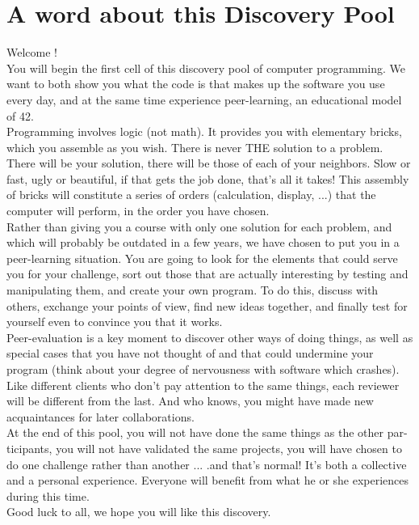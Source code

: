 \documentclass[12pt, a4paper]{report}
\begin{document}
\newpage

\chapter{A word about this Discovery Pool}
	\normalsize Welcome !
		\\
	\indent You will begin the first cell of this discovery pool of computer programming. We want
		to both show you what the code is that makes up the software you use every day, and at
		the same time experience peer-learning, an educational model of 42.
		\\
	\indent Programming involves logic (not math). It provides you with elementary bricks, which
		you assemble as you wish. There is never THE solution to a problem. There will be your
		solution, there will be those of each of your neighbors. Slow or fast, ugly or beautiful, if
		that gets the job done, that's all it takes! This assembly of bricks will constitute a series
		of orders (calculation, display, ...) that the computer will perform, in the order you have
		chosen.
		\\
	\indent Rather than giving you a course with only one solution for each problem, and which
		will probably be outdated in a few years, we have chosen to put you in a peer-learning
		situation. You are going to look for the elements that could serve you for your challenge,
		sort out those that are actually interesting by testing and manipulating them, and create
		your own program. To do this, discuss with others, exchange your points of view, find
		new ideas together, and finally test for yourself even to convince you that it works.
		\\
	\indent Peer-evaluation is a key moment to discover other ways of doing things, as well as
		special cases that you have not thought of and that could undermine your program (think
		about your degree of nervousness with software which crashes). Like different clients who
		don't pay attention to the same things, each reviewer will be different from the last. And
		who knows, you might have made new acquaintances for later collaborations.
		\\
	\indent At the end of this pool, you will not have done the same things as the other par-
		ticipants, you will not have validated the same projects, you will have chosen to do one
		challenge rather than another ... .and that's normal! It's both a collective and a personal
		experience. Everyone will benefit from what he or she experiences during this time.
		\\
	\indent Good luck to all, we hope you will like this discovery.
\end{document}
